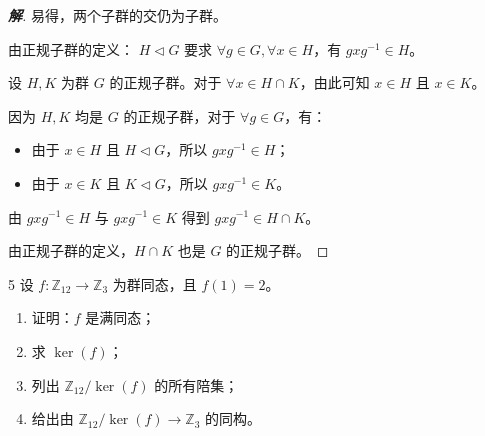 \documentclass[12pt, a4paper]{article}
\newenvironment{solution}{
    \begin{proof}[\textbf{解}]
}{
    \end{proof}
}
\begin{document}
\begin{solution}
    易得，两个子群的交仍为子群。

    由正规子群的定义： $H \triangleleft G$ 要求 $\forall g \in G, \forall x \in H$，有 $gxg^{-1} \in H$。

    设 $H, K$ 为群 $G$ 的正规子群。对于 $\forall x \in H \cap K$，由此可知 $x \in H$ 且 $x \in K$。
    
    因为 $H, K$ 均是 $G$ 的正规子群，对于 $\forall g \in G$，有：
    \begin{itemize}
        \item 由于 $x \in H$ 且 $H \triangleleft G$，所以 $gxg^{-1} \in H$；
        \item 由于 $x \in K$ 且 $K \triangleleft G$，所以 $gxg^{-1} \in K$。
    \end{itemize}
    
    由 $gxg^{-1} \in H$ 与 $gxg^{-1} \in K$ 得到 $gxg^{-1} \in H \cap K$。
    
    由正规子群的定义，$H \cap K$ 也是 $G$ 的正规子群。
\end{solution}

\begin{problem}{5}
    设 $f: \mathbb{Z}_{12} \to \mathbb{Z}_3$ 为群同态，且 $f(1) = 2$。
    \begin{enumerate}[(1)]
        \item 证明：$f$ 是满同态；
        \item 求 $\ker(f)$；
        \item 列出 $\mathbb{Z}_{12}/\ker(f)$ 的所有陪集；
        \item 给出由 $\mathbb{Z}_{12}/\ker(f) \to \mathbb{Z}_3$ 的同构。
    \end{enumerate}
\end{problem}
\end{document}

